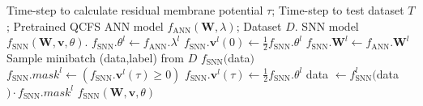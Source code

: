 \documentclass[letterpaper]{article} %
\begin{document}

\begin{algorithm}[t]
    \caption{The optimization strategy based on residual membrane potential (SRP)}
    \begin{algorithmic}[1]
        \REQUIRE Time-step to calculate residual membrane potential $\tau$; Time-step to test dataset $T$; Pretrained QCFS ANN model $f_\text{ANN}(\boldsymbol{W},\lambda)$; Dataset $D$.
        \ENSURE SNN model $f_\text{SNN}(\boldsymbol{W},\boldsymbol{v},\theta)$.
            \STATE $f_\text{SNN}.{\theta}^l\gets f_\text{ANN}.\lambda^l$
            \STATE $f_\text{SNN}.\boldsymbol{v}^l(0)\gets\frac{1}{2}f_\text{SNN}.{\theta}^l$
            \STATE $f_\text{SNN}.\boldsymbol{W}^l\gets f_\text{ANN}.\boldsymbol{W}^l$
        \ENDFOR
            \STATE Sample minibatch (data,label) from $D$
                \STATE $f_\text{SNN}($data$)$
            \ENDFOR
                \STATE $f_\text{SNN}.{mask}^l \gets(f_\text{SNN}.\boldsymbol{v}^l(\tau)\geqslant 0)$
                \STATE $f_\text{SNN}.\boldsymbol{v}^l(\tau)\gets\frac{1}{2}f_\text{SNN}.{\theta}^l$
            \ENDFOR
                    \STATE data $\gets f_\text{SNN}^l($data$)\cdot f_\text{SNN}.{mask}^l$
                \ENDFOR
            \ENDFOR
        \ENDFOR
        \RETURN $f_\text{SNN}(\boldsymbol{W},\boldsymbol{v},\theta)$
    \end{algorithmic}
    \label{algorithm01}
\end{algorithm}
\end{document}
